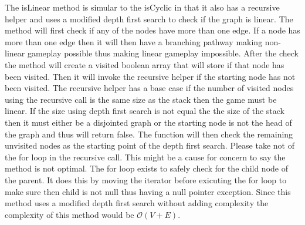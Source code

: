 \documentclass[11pt]{article}
\begin{document}
The isLinear method is simular to the isCyclic in that it also has a recursive helper and uses a modified depth first search to check if the graph is linear. The method will first check if any of the nodes have more than one edge. If a node has more than one edge then it will then have a branching pathway making non-linear gameplay possible thus making linear gameplay impossible. After the check the method will create a visited boolean array that will store if that node has been visited. Then it will invoke the recursive helper if the starting node has not been visited. The recursive helper has a base case if the number of visited nodes using the recursive call is the same size as the stack then the game must be linear. If the size using depth first search is not equal the the size of the stack then it must either be a disjointed graph or the starting node is not the head of the graph and thus will return false. The function will then check the remaining unvisited nodes as the starting point of the depth first search. Please take not of the for loop in the recursive call. This might be a cause for concern to say the method is not optimal. The for loop exists to safely check for the child node of the parent. It does this by moving the iterator before exicuting the for loop to make sure then child is not null thus having a null pointer exception. Since this method uses a modified depth first search without adding complexity the complexity of this method would be $\mathcal{O}(V+E)$.
\end{document}
